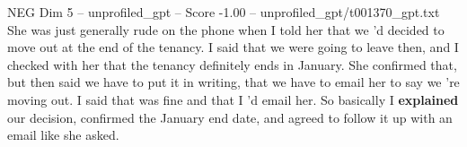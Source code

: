 \begin{textsample}{NEG Dim 5 – unprofiled\_gpt – Score -1.00 – unprofiled\_gpt/t001370\_gpt.txt}  \label{ex:f5_neg_011}
She was just generally rude on the phone when I told her that we ’d decided to move out at the end of the tenancy.
I said that we were going to leave then, and I checked with her that the tenancy definitely ends in January.
She confirmed that, but then said we have to put it in writing, that we have to email her to say we ’re moving out.
I said that was fine and that I ’d email her.
So basically I \textbf{explained} our decision, confirmed the January end date, and agreed to follow it up with an email like she asked.

\end{textsample}

